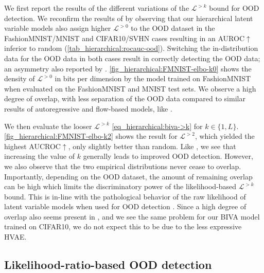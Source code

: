 {We first report the results of the different variations of the $\mathcal{L}^{>k}$ bound for OOD detection. 
We reconfirm the results of \textcite{nalisnick_deep_2019} by observing that our hierarchical latent variable models also assign higher $\mathcal{L}^{>0}$ to the OOD dataset in the FashionMNIST/MNIST and CIFAR10/SVHN cases resulting in an AUROC$\uparrow$ inferior to random (\cref{tab_hierarchical:rocauc-ood}).
Switching the in-distribution data for the OOD data in both cases result in correctly detecting the OOD data; an asymmetry also reported by \textcite{nalisnick_deep_2019}.
\cref{fig_hierarchical:FMNIST-elbo-k0} shows the density of $\mathcal{L}^{>0}$ in bits per dimension \parencite{theis_note_2016} by the model trained on FashionMNIST when evaluated on the FashionMNIST and MNIST test sets.
We observe a high degree of overlap, with less separation of the OOD data compared to similar results of autoregressive and flow-based models, like \textcite{xiao_likelihood_2020}.


We then evaluate the looser $\mathcal{L}^{>k}$ \cref{eq_hierarchical:biva->k} for $k\in\{1,L\}$.
\cref{fig_hierarchical:FMNIST-elbo-k2} shows the result for $\mathcal{L}^{>2}$, which yielded the highest AUCROC$\uparrow$, only slightly better than random.
Like \textcite{maaloe_biva_2019}, we see that increasing the value of $k$ generally leads to improved OOD detection.
However, we also observe that the two empirical distributions never cease to overlap.
Importantly, depending on the OOD dataset, the amount of remaining overlap can be high which limits the discriminatory power of the likelihood-based $\mathcal{L}^{>k}$ bound.
This is in-line with the pathological behavior of the raw likelihood of latent variable models when used for OOD detection \parencite{xiao_likelihood_2020}.
Since a high degree of overlap also seems present in \textcite{maaloe_biva_2019}, and we see the same problem for our BIVA model trained on CIFAR10, we do not expect this to be due to the less expressive HVAE.


\subsection{Likelihood-ratio-based OOD detection}

}
